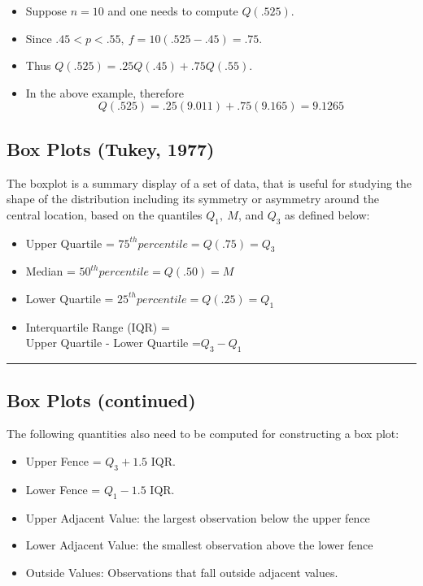 \documentclass[
  letterpaper,
  DIV=11,
  numbers=noendperiod]{scrartcl}
\begin{document}
\begin{itemize}
\item
  Suppose \(n = 10\) and one needs to compute \(Q(.525)\).
\item
  Since \(.45 < p < .55, \ f = 10 (.525 - .45)  = .75\).
\item
  Thus \(Q(.525)=.25Q(.45) +
  .75Q(.55)\).
\item
  In the above example, therefore
  \[Q(.525)= .25(9.011)+.75(9.165)=9.1265\]
\end{itemize}

\subsection{Box Plots (Tukey, 1977)}\label{box-plots-tukey-1977}

The boxplot is a summary display of a set of data, that is useful for
studying the shape of the distribution including its symmetry or
asymmetry around the central location, based on the quantiles
\(Q_1,\ M\), and \(Q_3\) as defined below:

\begin{itemize}
\item
  Upper Quartile = \(75^{ th} { percentile} =Q(.75)=Q_3\)
\item
  Median = \(50^{ th} { percentile} =Q(.50)=M\)
\item
  Lower Quartile = \(25^{ th} {percentile} =Q(.25)= Q_1\)
\item
  Interquartile Range (IQR) =\\
  Upper Quartile - Lower Quartile =\(Q_3- Q_1\)
\end{itemize}

\begin{center}\rule{0.5\linewidth}{0.5pt}\end{center}

\subsection{Box Plots (continued)}\label{box-plots-continued}

The following quantities also need to be computed for constructing a box
plot:

\begin{itemize}
\item
  Upper Fence = \(Q_3 + 1.5\) IQR.
\item
  Lower Fence = \(Q_1 - 1.5\) IQR.
\item
  Upper Adjacent Value: the largest observation below the upper fence
\item
  Lower Adjacent Value: the smallest observation above the lower fence
\item
  Outside Values: Observations that fall outside adjacent values.
\end{itemize}
\end{document}
